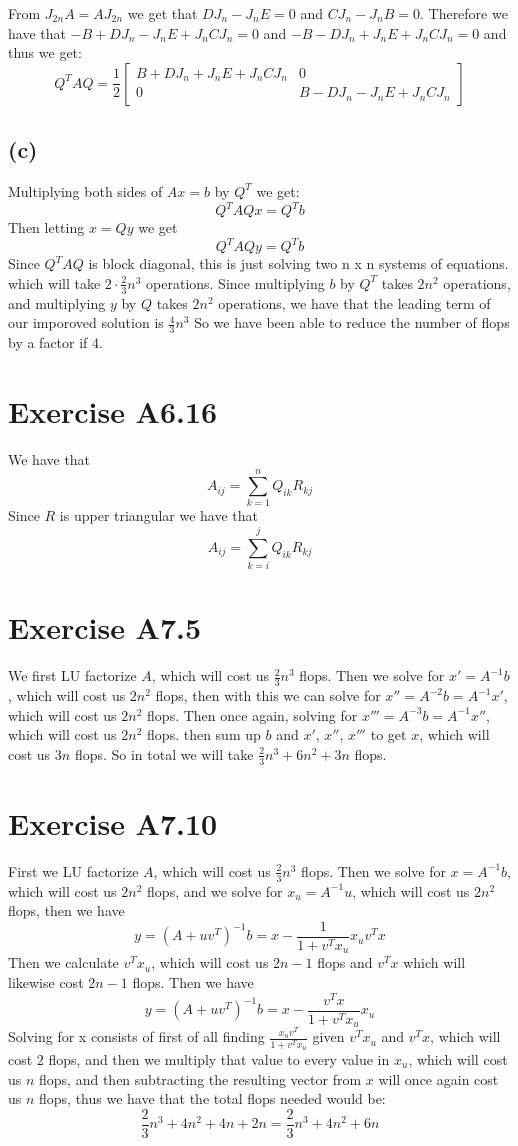 From $J_{2n}A=AJ_{2n}$ we get that $DJ_n-J_nE=0$ and 
$CJ_n-J_nB=0$. Therefore we have that $-B+DJ_n-J_nE+J_nCJ_n=0$
and $-B-DJ_n+J_nE+J_nCJ_n=0$ and thus we get:
$$Q^TAQ=\frac{1}{2} \begin{bmatrix}
        B+DJ_n+J_nE+J_nCJ_n & 0\\
        0 & B-DJ_n-J_nE+J_nCJ_n
    \end{bmatrix}$$
\subsection*{(c)}
Multiplying both sides of $Ax=b$ by $Q^T$ we get:
$$Q^TAQx=Q^Tb$$
Then letting $x=Qy$ we get
$$Q^TAQy=Q^Tb$$
Since $Q^TAQ$ is block diagonal, this is just solving
two n x n systems of equations. which will take $2\cdot\frac{2}{3}n^3$
operations. Since multiplying $b$ by $Q^T$ takes $2n^2$ operations,
and multiplying $y$ by $Q$ takes $2n^2$ operations, we have that
the leading term of our imporoved solution is $\frac{4}{3}n^3$ So
we have been able to reduce the number of flops by a factor if $4$.
\section*{Exercise A6.16}
We have that 
$$A_{ij}=\sum_{k=1}^n Q_{ik}R_{kj}$$
Since $R$ is upper triangular we have that 
$$A_{ij}=\sum_{k=i}^j Q_{ik}R_{kj}$$

\section*{Exercise A7.5}
We first LU factorize $A$, which will cost us $\frac{2}{3}n^3$ flops. 
Then we solve for $x'=A^{-1}b$, which will cost us $2n^2$ flops, then with this we can
solve for $x''=A^{-2}b=A^{-1}x'$, which will cost us $2n^2$ flops.
Then once again, solving for $x'''=A^{-3}b=A^{-1}x''$, which will cost us $2n^2$ flops.
then sum up $b$ and $x'$, $x''$, $x'''$ to get $x$, which will cost us 
$3n$ flops. So in total we will take $\boxed{\frac{2}{3}n^3+6n^2+3n}$ flops.
\section*{Exercise A7.10}
First we LU factorize $A$, which will cost us $\frac{2}{3}n^3$ flops. 
Then we solve for $x=A^{-1}b$, which will cost us $2n^2$ flops, and we solve
for $x_u=A^{-1}u$, which will cost us $2n^2$ flops, then we have
$$y=(A+uv^T)^{-1}b=x-\frac{1}{1+v^Tx_u}x_uv^Tx$$
Then we calculate $v^Tx_u$, which will cost us $2n-1$ flops and 
$v^Tx$ which will likewise cost $2n-1$ flops. Then we have
$$y=(A+uv^T)^{-1}b=x-\frac{v^Tx}{1+v^Tx_u}x_u$$
Solving for x consists of first of all finding $\frac{x_uv^T}{1+v^Tx_u}$ given 
$v^Tx_u$ and $v^Tx$, which will cost $2$ flops, and then we multiply that value 
to every value in $x_u$, which will cost us $n$ flops, and then subtracting
the resulting vector from $x$ will once again cost us $n$ flops, 
thus we have that the total flops needed would be:
$$\frac{2}{3}n^3+4n^2+4n+2n=\boxed{\frac{2}{3}n^3+4n^2+6n}$$







